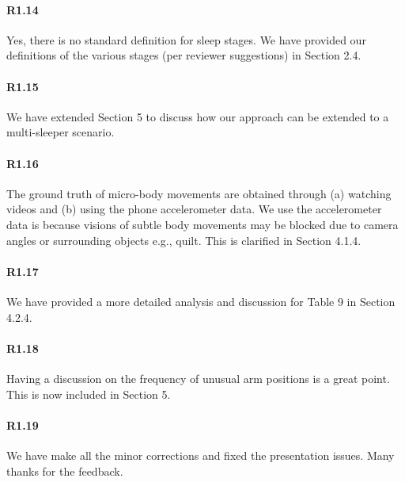 \paragraph{R1.14} Yes, there is no standard definition for sleep stages. We have provided our definitions of the various stages (per reviewer suggestions) in Section 2.4.

\paragraph{R1.15} We have extended Section 5 to discuss how our approach can be extended to a multi-sleeper scenario.

\paragraph{R1.16} The ground truth of micro-body movements are obtained through (a) watching videos and (b) using the phone accelerometer data. We use the accelerometer data is because visions of subtle body movements may be blocked due to camera angles or surrounding objects e.g., quilt. This is clarified in Section 4.1.4.

\paragraph{R1.17} We have provided a more detailed analysis and discussion for Table 9 in Section 4.2.4.

\paragraph{R1.18} Having a discussion on the frequency of unusual arm positions is a great point. This is now included in Section 5.

\paragraph{R1.19} We have make all the minor corrections and fixed the presentation issues. Many thanks for the feedback.
